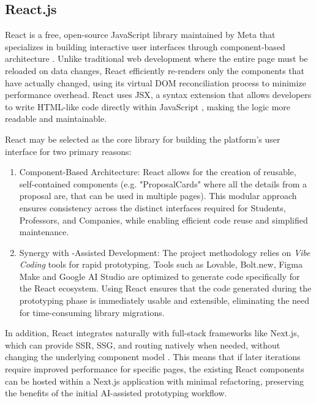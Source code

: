         \subsection{React.js}
            {
                React is a free, open-source JavaScript library maintained by Meta that specializes in building interactive user interfaces through component-based architecture \cite{react-docs-2026}.
                Unlike traditional web development where the entire page must be reloaded on data changes, React efficiently re-renders only the components that have actually changed, 
                using its virtual DOM reconciliation process to minimize performance overhead. React uses \gls{JSX}, a syntax extension that allows developers to write HTML-like code directly
                within JavaScript \cite{react-docs-2026}, making the  logic more readable and maintainable.
            }

            {
                React may be selected as the core library for building the platform's user interface for two primary reasons:
            }
            \begin{enumerate}
                \item {
                    Component-Based Architecture: React allows for the creation of reusable, self-contained  components
                    (e.g. "ProposalCards" where all the details from a proposal are, that can be used in multiple pages). 
                    This modular approach ensures consistency across the distinct interfaces required for Students, Professors, and Companies, 
                    while enabling efficient code reuse and simplified maintenance.
                }
                \item {
                    Synergy with -Assisted Development: The project methodology relies on \textit{Vibe Coding} tools for rapid prototyping.
                    Tools such as Lovable, Bolt.new, Figma Make and Google AI Studio are optimized to generate code specifically for the React ecosystem.
                    Using React ensures  that the code generated during the prototyping phase is immediately usable and extensible, eliminating the need for
                    time-consuming library migrations.
                }
            \end{enumerate}

            {
                In addition, React integrates naturally with full-stack frameworks like Next.js, which can provide \gls{SSR}, \gls{SSG}, and routing natively when needed,
                without changing the underlying component model \cite{next-js, nextjs-app-router, strapi-ssr-vs-ssg-next-js}. 
                This means that if later iterations require improved performance for specific pages, the existing React components can be hosted
                within a Next.js application with minimal refactoring, preserving the benefits of the initial AI-assisted prototyping workflow.
            }

